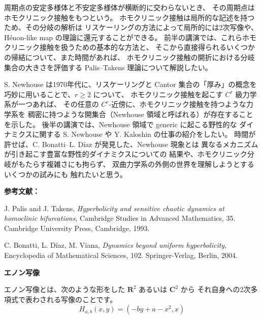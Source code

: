 \documentclass[uplatex,dvipdfmx]{jlreq}
\begin{document}
周期点の安定多様体と不安定多様体が横断的に交わらないとき、
その周期点はホモクリニック接触をもつという。
ホモクリニック接触は局所的な記述を持つため、その分岐の解析は
リスケーリングの方法によって局所的には2次写像や、
Hénon-like map の理論に還元することができる。
前半の講演では、これらホモクリニック接触を扱うための基本的な方法と、
そこから直接得られるいくつかの帰結について、また時間があれば、
ホモクリニック接触の開折における分岐集合の大きさを評価する
Palis--Takens 理論について解説したい。

S. Newhouse は1970年代に、リスケーリングと Cantor 集合の「厚み」の概念を
巧妙に用いることで、$r \geq 2$ について、
ホモクリニック接触を起こす $C^r$ 級力学系が一つあれば、
その任意の $C^r$-近傍に、ホモクリニック接触を持つような力学系を
稠密に持つような開集合（Newhouse 領域と呼ばれる）が存在することを示した。
後半の講演では、Newhouse 領域で generic に起こる野性的な
ダイナミクスに関する S. Newhouse や Y. Kaloshin の仕事の紹介をしたい。
時間が許せば、C. Bonatti--L. Díaz が発見した、Newhouse 現象とは
異なるメカニズムが引き起こす豊富な野性的ダイナミクスについての
結果や、ホモクリニック分岐がもたらす複雑さにも拘らず、
双曲力学系の外側の世界を理解しようとするいくつかの試みにも
触れたいと思う。

\bigskip
\noindent\textbf{参考文献：}
\begin{enumerate}[{[1]}]
\item J. Palis and J. Takens,
\textit{Hyperbolicity and sensitive chaotic dynamics at homoclinic bifurcations},
Cambridge Studies in Advanced Mathematics, 35.
Cambridge University Press, Cambridge, 1993.
\item C. Bonatti, L. Díaz, M. Viana,
\textit{Dynamics beyond uniform hyperbolicity},
Encyclopedia of Mathematical Sciences, 102.
Springer-Verlag, Berlin, 2004.
\end{enumerate}

\newpage

\begin{center}
{\large\bfseries エノン写像}\\[6pt]
\hspace*{\fill}{\large\bfseries 三波 篤郎（北見工業大学 情報システム工学科）}
\end{center}
\vspace{1pc}

エノン写像とは、次のような形をした $\mathbf{R}^2$ あるいは $\mathbf{C}^2$ から
それ自身への2次多項式で表わされる写像のことです。
\[H_{a,b}(x,y)=(-by+a-x^2,x)\]
\end{document}
